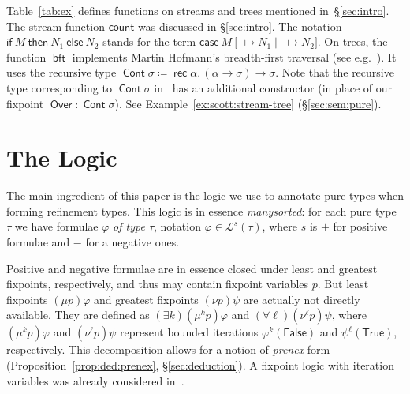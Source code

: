 \documentclass[%
  a4paper,
  UKenglish,
  cleveref,
  autoref,
  thm-restate,
  numberwithinsect,
]{lipics-v2021}
\newcommand\deq\coloneqq
\newcommand\copair[1]{{\lbrack #1 \rbrack}}
\newcommand\temp[1]{\mathsf{#1}}
\newcommand\True{\temp{True}}
\newcommand\False{\temp{False}}
\newcommand\term[1]{\mathsf{#1}}
\newcommand\type[1]{\term{#1}}
\newcommand\cse{\term{case}}
\newcommand\cnt{\term{count}}
\newcommand\Over{\mathop{\term{Over}}}
\newcommand\bft{\mathop{\term{bft}}}
\newcommand\arrow\to
\newcommand\Cont{\mathop{\type{Cont}}}
\newcommand\rec{\mathop{\type{rec}}}	%
\newcommand\TV{\alpha}		%
\newcommand\PT{\tau}		%
\newcommand\PTbis{\sigma}	%
\newcommand\itvar{k}
\newcommand\itvarbis{\ell}
\newcommand\FP{p}
\newcommand\finmu{\mu}
\newcommand\finnu{\nu}
\newcommand\Lang{\mathcal{L}}
\newcommand\sign{s}
\begin{document}
\begin{example}
\label{ex:pure:fun}
Table~\ref{tab:ex} defines functions on streams and trees
mentioned in~\S\ref{sec:intro}.
%
The stream function $\cnt$ was discussed in \S\ref{sec:intro}.
The notation
$\term{if}~ M ~\term{then}~ N_{1} ~\term{else}~ N_{2}$
stands for the term
$\cse\ M\ \copair{\_ \mapsto N_1 \mid \_ \mapsto N_2}$.
%
On trees, the function $\bft$ implements Martin Hofmann's breadth-first traversal
(see e.g.~\cite{bms19types,jr21esop,rk25wollic,kw26popl}).
It uses the recursive type
$\Cont \PTbis \deq \rec\TV.\, (\TV \arrow \PTbis) \arrow \PTbis$.
Note that the recursive type corresponding to $\Cont \PTbis$
in~\cite{bms19types,jr21esop,kw26popl}
has an additional constructor
(in place of our fixpoint $\Over \colon \Cont\PTbis$).
See Example~\ref{ex:scott:stream-tree} (\S\ref{sec:sem:pure}).
\lipicsEnd
\end{example}




\section{The Logic}
\label{sec:log}

The main ingredient of this paper is the logic 
we use to annotate pure types when forming refinement types.
This logic is in essence \emph{manysorted}:
for each pure type $\PT$ we have formulae $\varphi$ \emph{of type $\PT$},
notation $\varphi \in \Lang^\sign(\PT)$,
where $\sign$ is $+$ for positive formulae and $-$ for a negative ones.

Positive and negative formulae are in essence closed under
least and greatest fixpoints, respectively,
and thus may contain fixpoint variables $\FP$.
%
But least fixpoints $(\mu \FP)\varphi$
and greatest fixpoints $(\nu \FP)\psi$ are actually not directly available.
They are defined %
as $(\exists \itvar)(\finmu^\itvar \FP)\varphi$
and $(\forall \itvarbis)(\finnu^\itvarbis \FP)\psi$,
where $(\finmu^\itvar \FP)\varphi$ and $(\finnu^\itvarbis \FP)\psi$
represent bounded iterations
$\varphi^{\itvar}(\False)$ and $\psi^{\itvarbis}(\True)$,
respectively.
This decomposition allows for a notion of \emph{prenex} form
(Proposition~\ref{prop:ded:prenex}, \S\ref{sec:deduction}).
%
A fixpoint logic with iteration variables was already
considered in~\cite{sd03fossacs}.
\end{document}
